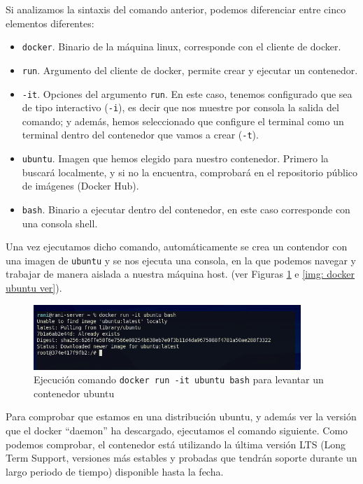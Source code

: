 \documentclass[12pt]{article}
\begin{document}
	\noindent Si analizamos la sintaxis del comando anterior, podemos diferenciar entre cinco elementos diferentes:
	\begin{itemize}
		\item \texttt{docker}. Binario de la máquina linux, corresponde con el cliente de docker.
		\item \texttt{run}. Argumento del cliente de docker, permite crear y ejecutar un contenedor.
		\item \texttt{-it}. Opciones del argumento \texttt{run}. En este caso, tenemos configurado que sea de tipo interactivo (\texttt{-i}), es decir que nos muestre por consola la salida del comando; y además, hemos seleccionado que configure el terminal como un terminal dentro del contenedor que vamos a crear (\texttt{-t}).
		\item \texttt{ubuntu}. Imagen que hemos elegido para nuestro contenedor. Primero la buscará localmente, y si no la encuentra, comprobará en el repositorio público de imágenes (Docker Hub).
		\item \texttt{bash}. Binario a ejecutar dentro del contenedor, en este caso corresponde con una consola shell.
	\end{itemize}

	\noindent Una vez ejecutamos dicho comando, automáticamente se crea un contendor con una imagen de \texttt{ubuntu} y se nos ejecuta una consola, en la que podemos navegar y trabajar de manera aislada a nuestra máquina host. (ver Figuras \ref{img: docker ubuntu} e \ref{img: docker ubuntu ver}).
	
	\pagebreak
	
	\begin{figure}[h]
		\begin{center}
			\includegraphics[width=0.9\textwidth]{img/docker_ubuntu.png}
			\caption{Ejecución comando \texttt{docker run -it ubuntu bash} para levantar un contenedor ubuntu}
			\label{img: docker ubuntu}
		\end{center}
	\end{figure}


	\noindent Para comprobar que estamos en una distribución ubuntu, y además ver la versión que el docker ``daemon'' ha descargado, ejecutamos el comando siguiente. Como podemos comprobar, el contenedor está utilizando la última versión LTS (Long Term Support, versiones más estables y probadas que tendrán soporte durante un largo periodo de tiempo) disponible hasta la fecha.
	
\end{document}
